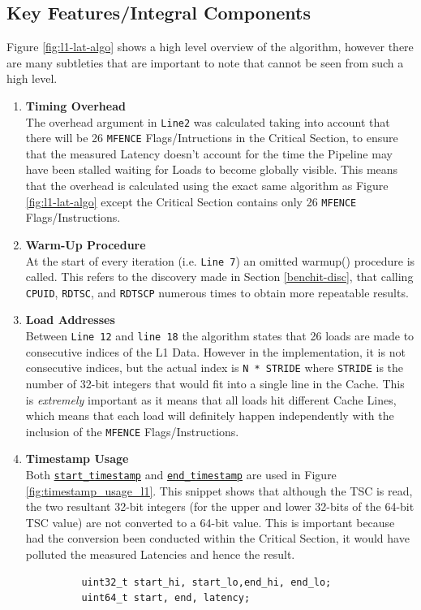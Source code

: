 \documentclass[bsc,frontabs,twoside,singlespacing,parskip,deptreport]{infthesis}     %
\begin{document}
\subsection{Key Features/Integral Components}\label{sec:l1-lat-key-comp}
Figure \ref{fig:l1-lat-algo} shows a high level overview of the algorithm, however there are many subtleties that are important to note that cannot be seen from such a high level.
\begin{enumerate}
    \item{{\bf Timing Overhead} \\
    The overhead argument in \texttt{Line2} was calculated taking into account that there will be 26 \texttt{MFENCE} Flags/Intructions in the Critical Section, to ensure that the measured Latency doesn't account for the time the Pipeline may have been stalled waiting for Loads to become globally visible. This means that the overhead is calculated using the exact same algorithm as Figure \ref{fig:l1-lat-algo} except the Critical Section contains only 26 \texttt{MFENCE} Flags/Instructions.}\label{timing-overhead-consideration-L1}
    
    \item{{\bf Warm-Up Procedure} \\
    At the start of every iteration (i.e. \texttt{Line 7}) an omitted warmup() procedure is called. This refers to the discovery made in Section \ref{benchit-disc}, that calling \texttt{CPUID}, \texttt{RDTSC}, and \texttt{RDTSCP} numerous times to obtain more repeatable results. }
    
    \item{{\bf Load Addresses} \\
    Between \texttt{Line 12} and \texttt{line 18} the algorithm states that 26 loads are made to consecutive indices of the L1 Data. However in the implementation, it is not consecutive indices, but the actual index is \texttt{N * STRIDE} where \texttt{STRIDE} is the number of 32-bit integers that would fit into a single line in the Cache. This is \emph{extremely} important as it means that all loads hit different Cache Lines, which means that each load will definitely happen independently with the inclusion of the \texttt{MFENCE} Flags/Instructions.}
    
    \item{{\bf Timestamp Usage} \\
    Both \hyperref[fig:starttimestamp-code]{\texttt{start\_timestamp}} and \hyperref[fig:endtimestamp-code]{\texttt{end\_timestamp}} are used in Figure \ref{fig:timestamp_usage_l1}. This snippet shows that although the TSC is read, the two resultant 32-bit integers (for the upper and lower 32-bits of the 64-bit TSC value) are not converted to a 64-bit value. This is important because had the conversion been conducted within the Critical Section, it would have polluted the measured Latencies and hence the result.
    \begin{figure}[h!]
        \centering
        \begin{verbatim}
    uint32_t start_hi, start_lo,end_hi, end_lo;
    uint64_t start, end, latency;
    

\end{verbatim}
\end{figure}}
\end{enumerate}
\end{document}

